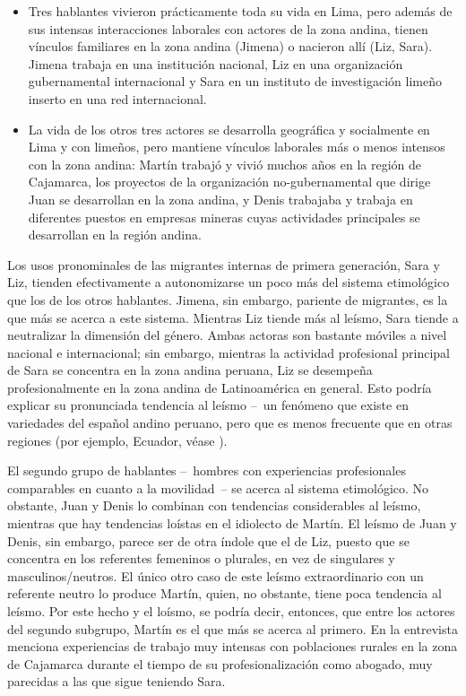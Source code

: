 \documentclass[output=paper]{../langscibook}
\begin{document}
\begin{itemize}
\item Tres hablantes vivieron prácticamente toda su vida en Lima, pero además de sus intensas interacciones laborales con actores de la zona andina, tienen vínculos familiares en la zona andina (Jimena) o nacieron allí (Liz, Sara). Jimena trabaja en una institución nacional, Liz en una organización gubernamental internacional y Sara en un instituto de investigación limeño inserto en una red internacional.
\item La vida de los otros tres actores se desarrolla geográfica y socialmente en Lima y con limeños, pero mantiene vínculos laborales más o menos intensos con la zona andina: Martín trabajó y vivió muchos años en la región de Cajamarca, los proyectos de la organización no-gubernamental que dirige Juan se desarrollan en la zona andina, y Denis trabajaba y trabaja en diferentes puestos en empresas mineras cuyas actividades principales se desarrollan en la región andina.
\end{itemize}

\largerpage
Los usos pronominales de las migrantes internas de primera generación, Sara y Liz, tienden efectivamente a autonomizarse un poco más del sistema etimológico que los de los otros hablantes. Jimena, sin embargo, pariente de migrantes, es la que más se acerca a este sistema. Mientras Liz tiende más al leísmo, Sara tiende a neutralizar la dimensión del género. Ambas actoras son bastante móviles a nivel nacional e internacional; sin embargo, mientras la actividad profesional principal de Sara se concentra en la zona andina peruana, Liz se desempeña profesionalmente en la zona andina de Latinoamérica en general. Esto podría explicar su pronunciada tendencia al leísmo – un fenómeno que existe en variedades del español andino peruano, pero que es menos frecuente que en otras regiones (por ejemplo, Ecuador, véase \citealt{KleeLynch2009book}).

El segundo grupo de hablantes – hombres con experiencias profesionales comparables en cuanto a la movilidad – se acerca al sistema etimológico. No obstante, Juan y Denis lo combinan con tendencias considerables al leísmo, mientras que hay tendencias loístas en el idiolecto de Martín. El leísmo de Juan y Denis, sin embargo, parece ser de otra índole que el de Liz, puesto que se concentra en los referentes femeninos o plurales, en vez de singulares y masculinos/neutros. El único otro caso de este leísmo extraordinario con un referente neutro lo produce Martín, quien, no obstante, tiene poca tendencia al leísmo. Por este hecho y el loísmo, se podría decir, entonces, que entre los actores del segundo subgrupo, Martín es el que más se acerca al primero. En la entrevista menciona experiencias de trabajo muy intensas con poblaciones rurales en la zona de Cajamarca durante el tiempo de su profesionalización como abogado, muy parecidas a las que sigue teniendo Sara.
\end{document}
